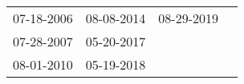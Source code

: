 \begin{supertabular}{llll}
 07-18-2006 &  08-08-2014 &  08-29-2019 \\
 07-28-2007 &  05-20-2017 &             \\
 08-01-2010 &  05-19-2018 &             \\
\end{supertabular}
